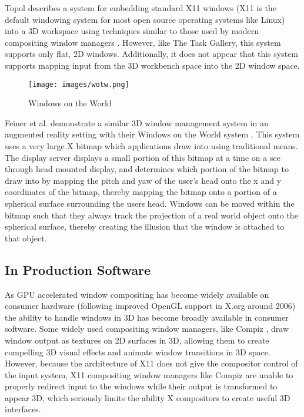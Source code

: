 
Topol describes a system for embedding standard X11 windows (X11 is the default windowing system for most open source operating systems like Linux) into a 3D workspace using techniques similar to those used by modern compositing window managers \cite{xwindow_immersion}. However, like The Task Gallery, this system supports only flat, 2D windows. Additionally, it does not appear that this system supports mapping input from the 3D workbench space into the 2D window space.

\begin{figure}[ht!]
\centering
\texttt{[image: images/wotw.png]}
\caption{Windows on the World \protect\cite{wotw}}
\end{figure}

Feiner et al. demonstrate a similar 3D window management system in an augmented reality setting with their Windows on the World system \cite{wotw}. This system uses a very large X bitmap which applications draw into using traditional means. The display server displays a small portion of this bitmap at a time on a see through head mounted display, and determines which portion of the bitmap to draw into by mapping the pitch and yaw of the user's head onto the x and y coordinates of the bitmap, thereby mapping the bitmap onto a portion of a spherical surface surrounding the users head. Windows can be moved within the bitmap such that they always track the projection of a real world object onto the spherical surface, thereby creating the illusion that the window is attached to that object.
 
\subsection{In Production Software}

As GPU accelerated window compositing has become widely available on consumer hardware (following improved OpenGL support in X.org around 2006) the ability to handle windows in 3D has become broadly available in consumer software.  Some widely used compositing window managers, like Compiz \cite{compiz}, draw window output as textures on 2D surfaces in 3D, allowing them to create compelling 3D visual effects and animate window transitions in 3D space. However, because the architecture of X11 does not give the compositor control of the input system, X11 compositing window managers like Compiz are unable to properly redirect input to the windows while their output is transformed to appear 3D, which seriously limits the ability X compositors to create useful 3D interfaces.


